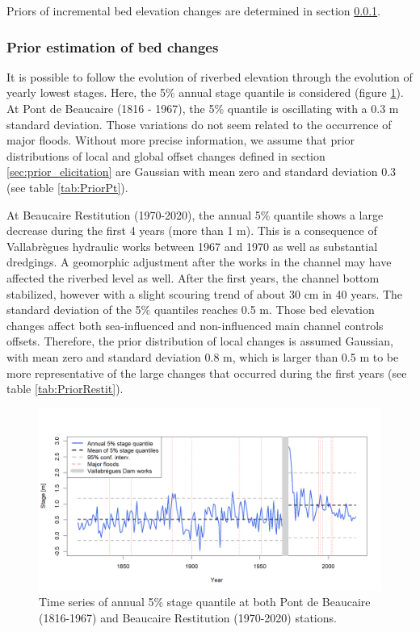 \documentclass[11pt]{article}
\begin{document}
        Priors of incremental bed elevation changes are determined in section \ref{sec:stageevolution}.

    \subsubsection{Prior estimation of bed changes}
    \label{sec:stageevolution}
    
    It is possible to follow the evolution of riverbed elevation through the evolution of yearly lowest stages. Here, the 5\% annual stage quantile is considered (figure \ref{fig:quantile5_both}). At Pont de Beaucaire (1816 - 1967), the 5\% quantile is oscillating with a 0.3 m standard deviation. Those variations do not seem related to the occurrence of major floods. Without more precise information, we assume that prior distributions of local and global offset changes defined in section \ref{sec:prior_elicitation} are Gaussian with mean zero and standard deviation 0.3 (see table \ref{tab:PriorPt}).
    
    At Beaucaire Restitution (1970-2020), the annual 5\% quantile shows a large decrease during the first 4 years (more than 1 m). This is a consequence of Vallabrègues hydraulic works between 1967 and 1970 as well as substantial dredgings. A geomorphic adjustment after the works in the channel may have affected the riverbed level as well. After the first years, the channel bottom stabilized, however with a slight scouring trend of about 30 cm in 40 years. The standard deviation of the 5\% quantiles reaches 0.5 m. Those bed elevation changes affect both sea-influenced and non-influenced main channel controls offsets. Therefore, the prior distribution of local changes is assumed Gaussian, with mean zero and standard deviation 0.8 m, which is larger than 0.5 m to be more representative of the large changes that occurred during the first years (see table \ref{tab:PriorRestit}).
    
    \begin{figure}[h]
        \centering
        \includegraphics[width = 15cm]{Figs/5-Quant5perc_both.png}
        \caption{Time series of annual 5\% stage quantile at both Pont de Beaucaire (1816-1967) and Beaucaire Restitution (1970-2020) stations.}
        \label{fig:quantile5_both}
    \end{figure}
        
\end{document}
